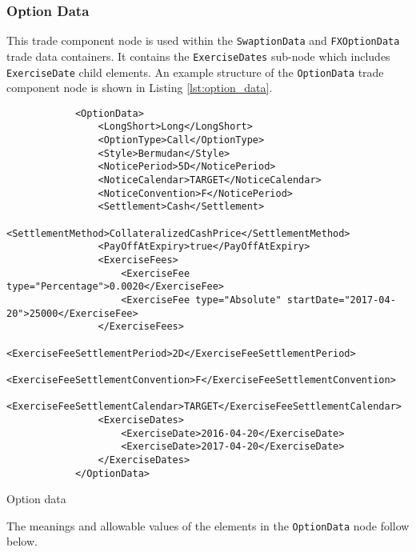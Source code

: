 \subsubsection{Option Data}
\label{ss:option_data} 
This trade component node is used within the \lstinline!SwaptionData! and \lstinline!FXOptionData! trade data
containers. It contains the \lstinline!ExerciseDates! sub-node which includes \lstinline!ExerciseDate! child
elements. An example structure of the \lstinline!OptionData! trade component node is shown in Listing
\ref{lst:option_data}.

\begin{listing}[H]
\begin{verbatim}
            <OptionData>
                <LongShort>Long</LongShort>
                <OptionType>Call</OptionType>
                <Style>Bermudan</Style>
                <NoticePeriod>5D</NoticePeriod>
                <NoticeCalendar>TARGET</NoticeCalendar>
                <NoticeConvention>F</NoticePeriod>
                <Settlement>Cash</Settlement>
                <SettlementMethod>CollateralizedCashPrice</SettlementMethod>
                <PayOffAtExpiry>true</PayOffAtExpiry>
                <ExerciseFees>
                    <ExerciseFee type="Percentage">0.0020</ExerciseFee>
                    <ExerciseFee type="Absolute" startDate="2017-04-20">25000</ExerciseFee>
                </ExerciseFees>
                <ExerciseFeeSettlementPeriod>2D</ExerciseFeeSettlementPeriod>
                <ExerciseFeeSettlementConvention>F</ExerciseFeeSettlementConvention>
                <ExerciseFeeSettlementCalendar>TARGET</ExerciseFeeSettlementCalendar>
                <ExerciseDates>
                    <ExerciseDate>2016-04-20</ExerciseDate>
                    <ExerciseDate>2017-04-20</ExerciseDate>
                </ExerciseDates>
            </OptionData>
\end{verbatim}
\caption{Option data}
\label{lst:option_data}
\end{listing}

The meanings and allowable values of the elements in the \lstinline!OptionData! node follow below.

